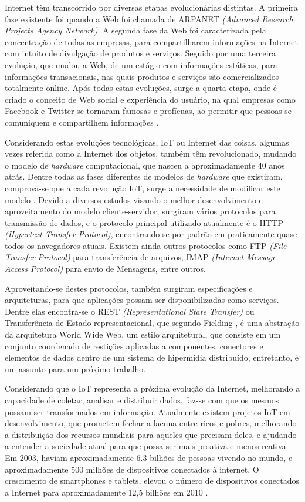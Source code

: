 \documentclass[journal]{IEEEtran}
\begin{document}
 Internet têm transcorrido por diversas etapas evolucionárias distintas. A primeira fase existente foi quando a Web foi chamada de ARPANET \emph{(Advanced Research Projects Agency Network)}. A segunda fase da Web foi caracterizada pela concentração de todas as empresas, para compartilharem informações na Internet com intuito de divulgação de produtos e serviços. Seguido por uma terceira evolução, que mudou a Web, de um estágio com informações estáticas, para informações transacionais, nas quais produtos e serviços são comercializados totalmente online. Após todas estas evoluções, surge a quarta etapa, onde é criado o conceito de Web social e experiência do usuário, na qual empresas como Facebook e Twitter se tornaram famosas e profícuas, ao permitir que pessoas se comuniquem e compartilhem informações \cite[p.~6]{Evans}.

Considerando estas evoluções tecnológicas, IoT ou Internet das coisas, algumas vezes referida como a Internet dos objetos, também têm revolucionado, mudando o modelo de \emph{hardware} computacional, que nasceu a aproximadamente 40 anos atrás. Dentre todas as fases diferentes de modelos de \emph{hardware} que existiram, comprova-se que a cada revolução IoT, surge a necessidade de modificar este modelo \cite[p.~6]{dzonevoltreeiot}. Devido a diversos estudos visando o melhor desenvolvimento e aproveitamento do modelo cliente-servidor, surgiram vários protocolos para transmissão de dados, e o protocolo principal utilizado atualmente é o HTTP \emph{(Hypertext Transfer Protocol)}, encontrando-se por padrão em praticamente quase todos os navegadores atuais. Existem ainda outros protocolos como FTP \emph{(File Transfer Protocol)} para transferência de arquivos, IMAP \emph{(Internet Message Access Protocol)} para envio de Mensagens, entre outros. 

Aproveitando-se destes protocolos, também surgiram especificações e arquiteturas, para que aplicações possam ser disponibilizadas como serviços. Dentre elas encontra-se o REST \emph{(Representational State Transfer)} ou Transferência de Estado representacional, que segundo Fielding \cite{roythomasfielding2017}, é uma abstração da arquitetura World Wide Web, um estilo  arquitetural, que consiste em um conjunto coordenado de restições aplicadas a componentes, conectores e elementos de dados dentro de um sistema de hipermídia distribuído, entretanto, é um assunto para um próximo trabalho.

Considerando que o IoT representa a próxima evolução da Internet, melhorando a capacidade de coletar, analisar e distribuir dados, faz-se com que os mesmos possam ser transformados em informação. Atualmente existem projetos IoT em desenvolvimento, que prometem fechar a lacuna entre ricos e pobres, melhorando a distribuição dos recursos mundiais para aqueles que precisam deles, e ajudando a entender a sociedade atual para que possa ser mais proativa e menos reativa \cite[p.~2]{Evans}. Em 2003, haviam aproximadamente 6.3 bilhões de pessoas vivendo no mundo, e aproximadamente 500 milhões de dispositivos conectados à internet. O crescimento de smartphones e tablets, elevou o número de dispositivos conectados a Internet para aproximadamente 12,5 bilhões em 2010 \cite[p.~3]{Evans}.
\end{document}
